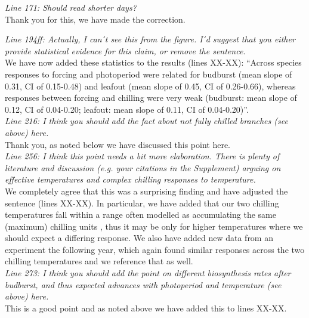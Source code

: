 \documentclass[11pt,a4paper]{article}
\begin{document}
\emph{Line 171: Should read shorter days?}\\

Thank you for this, we have made the correction. 

\emph{Line 194ff: Actually, I can ́t see this from the figure. I ́d suggest that you either provide
statistical evidence for this claim, or remove the sentence.}\\

We have now added these statistics to the results (lines XX-XX): ``Across species responses to forcing and photoperiod were related for budburst (mean slope of 0.31, CI of 0.15-0.48) and leafout (mean slope of 0.45, CI of 0.26-0.66), whereas responses between forcing and chilling were very weak (budburst: mean slope of 0.12, CI of 0.04-0.20; leafout: mean slope of 0.11, CI of 0.04-0.20)''.\\

\emph{Line 216: I think you should add the fact about not fully chilled branches (see above) here.}\\

Thank you, as noted below we have discussed this point here. \\

\emph{Line 256: I think this point needs a bit more elaboration. There is plenty of literature and
discussion (e.g. your citations in the Supplement) arguing on effective temperatures and
complex chilling responses to temperature.}\\

We completely agree that this was a surprising finding and have adjusted the sentence (lines XX-XX). In particular, we have added that our two chilling temperatures fall within a range often modelled as accumulating the same (maximum) chilling units \citep[for example, see][]{harrington2015}, thus it may be only for higher temperatures where we should expect a differing response. We also have added new data from an experiment the following year, which again found similar responses across the two chilling temperatures and we reference that as well. \\

\emph{Line 273: I think you should add the point on different biosynthesis rates after budburst,
and thus expected advances with photoperiod and temperature (see above) here.}\\

This is a good point and as noted above we have added this to lines XX-XX. \\

\newpage

\end{document}
